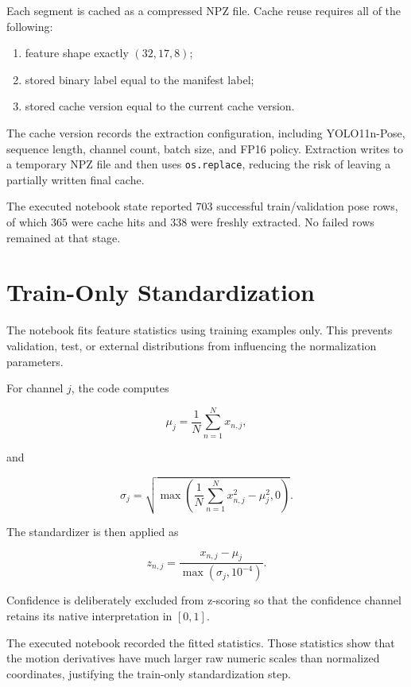 \documentclass[11pt,a4paper]{article}
\newcommand{\code}[1]{\texttt{#1}}
\begin{document}
Each segment is cached as a compressed NPZ file. Cache reuse requires all of the following:

\begin{enumerate}[leftmargin=1.5em]
\item feature shape exactly $(32,17,8)$;
\item stored binary label equal to the manifest label;
\item stored cache version equal to the current cache version.
\end{enumerate}

The cache version records the extraction configuration, including YOLO11n-Pose, sequence length, channel count, batch size, and FP16 policy. Extraction writes to a temporary NPZ file and then uses \code{os.replace}, reducing the risk of leaving a partially written final cache.

The executed notebook state reported $703$ successful train/validation pose rows, of which $365$ were cache hits and $338$ were freshly extracted. No failed rows remained at that stage.

\section{Train-Only Standardization}

The notebook fits feature statistics using training examples only. This prevents validation, test, or external distributions from influencing the normalization parameters.

For channel $j$, the code computes

\begin{equation}
\mu_j
=
\frac{1}{N}
\sum_{n=1}^{N}x_{n,j},
\end{equation}

and

\begin{equation}
\sigma_j
=
\sqrt{
\max
\left(
\frac{1}{N}\sum_{n=1}^{N}x_{n,j}^2-\mu_j^2,
0
\right)
}.
\end{equation}

The standardizer is then applied as

\begin{equation}
z_{n,j}
=
\frac{x_{n,j}-\mu_j}{\max(\sigma_j,10^{-4})}.
\end{equation}

Confidence is deliberately excluded from z-scoring so that the confidence channel retains its native interpretation in $[0,1]$.

The executed notebook recorded the fitted statistics. Those statistics show that the motion derivatives have much larger raw numeric scales than normalized coordinates, justifying the train-only standardization step.
\end{document}
